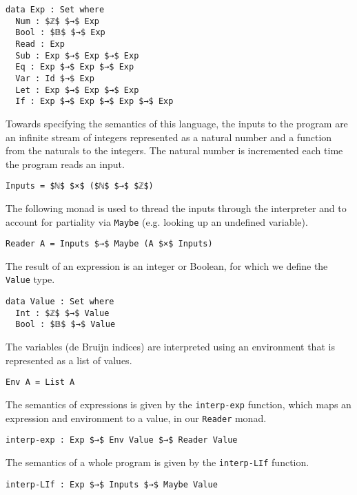 \documentclass[sigplan,review,dvipsnames,screen,10pt]{acmart}
\begin{document}
\begin{lstlisting}
data Exp : Set where
  Num : $ℤ$ $→$ Exp
  Bool : $𝔹$ $→$ Exp
  Read : Exp
  Sub : Exp $→$ Exp $→$ Exp
  Eq : Exp $→$ Exp $→$ Exp
  Var : Id $→$ Exp
  Let : Exp $→$ Exp $→$ Exp
  If : Exp $→$ Exp $→$ Exp $→$ Exp
\end{lstlisting}

Towards specifying the semantics of this language, the inputs to the
program are an infinite stream of integers represented as a natural
number and a function from the naturals to the integers.  The natural
number is incremented each time the program reads an input.

\begin{lstlisting}
Inputs = $ℕ$ $×$ ($ℕ$ $→$ $ℤ$)
\end{lstlisting}

The following monad is used to thread the inputs through the
interpreter and to account for partiality via \lstinline{Maybe}
(e.g. looking up an undefined variable).

\begin{lstlisting}
Reader A = Inputs $→$ Maybe (A $×$ Inputs)
\end{lstlisting}

\noindent The result of an expression is an integer or Boolean, for which we
define the \lstinline{Value} type.

\begin{lstlisting}
data Value : Set where
  Int : $ℤ$ $→$ Value
  Bool : $𝔹$ $→$ Value
\end{lstlisting}

\noindent The variables (de Bruijn indices) are interpreted using an
environment that is represented as a list of values.

\begin{lstlisting}
Env A = List A
\end{lstlisting}

\noindent The semantics of expressions is given by the
\lstinline{interp-exp} function, which maps an expression and
environment to a value, in our \lstinline{Reader} monad.

\begin{lstlisting}
interp-exp : Exp $→$ Env Value $→$ Reader Value
\end{lstlisting}

\noindent The semantics of a whole program is given by the
\lstinline{interp-LIf} function.

\begin{lstlisting}
interp-LIf : Exp $→$ Inputs $→$ Maybe Value
\end{lstlisting}
\end{document}
